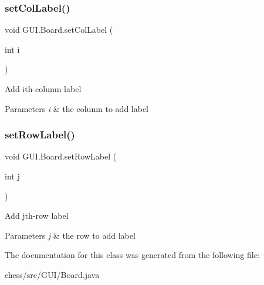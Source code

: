 \subsubsection{\texorpdfstring{setColLabel()}{setColLabel()}}
{\footnotesize\ttfamily void G\+U\+I.\+Board.\+set\+Col\+Label (\begin{DoxyParamCaption}\item[{int}]{i }\end{DoxyParamCaption})\hspace{0.3cm}{\ttfamily [inline]}}

Add ith-\/column label


\begin{DoxyParams}{Parameters}
{\em i} & the column to add label \\
\hline
\end{DoxyParams}
\mbox{\label{class_g_u_i_1_1_board_a9536cdbbbc77d61a9b9cede722578ad1}} 
\subsubsection{\texorpdfstring{setRowLabel()}{setRowLabel()}}
{\footnotesize\ttfamily void G\+U\+I.\+Board.\+set\+Row\+Label (\begin{DoxyParamCaption}\item[{int}]{j }\end{DoxyParamCaption})\hspace{0.3cm}{\ttfamily [inline]}}

Add jth-\/row label


\begin{DoxyParams}{Parameters}
{\em j} & the row to add label \\
\hline
\end{DoxyParams}


The documentation for this class was generated from the following file\+:\begin{DoxyCompactItemize}
\item 
chess/src/\+G\+U\+I/Board.\+java\end{DoxyCompactItemize}
